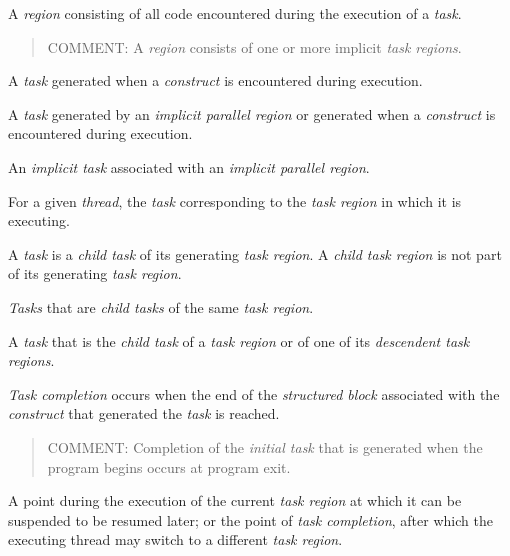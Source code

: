 \glossarydefstart
A \emph{region} consisting of all code encountered during the execution of a \emph{task}. 

\begin{quote}
COMMENT: A  \emph{region} consists of one or more implicit \emph{task regions}. 
\end{quote}
\glossarydefend

\glossarydefstart
A \emph{task} generated when a  \emph{construct} is encountered during execution.
\glossarydefend

\glossarydefstart
A \emph{task} generated by an \emph{implicit parallel region} or generated when a 
\emph{construct} is encountered during execution.
\glossarydefend

\glossarydefstart
An \emph{implicit task} associated with an \emph{implicit parallel region}.
\glossarydefend

\glossarydefstart
For a given \emph{thread}, the \emph{task} corresponding to the \emph{task region} in which it is 
executing.
\glossarydefend

\glossarydefstart
A \emph{task} is a \emph{child task} of its generating \emph{task region}. 
A \emph{child task region} is not part of its generating \emph{task region}.
\glossarydefend

\glossarydefstart
\emph{Tasks} that are \emph{child tasks} of the same \emph{task region}.
\glossarydefend

\glossarydefstart
A \emph{task} that is the \emph{child task} of a \emph{task region} or of one of its 
\emph{descendent task regions}.
\glossarydefend

\glossarydefstart
\emph{Task completion} occurs when the end of the \emph{structured block} associated with the 
\emph{construct} that generated the \emph{task} is reached.

\begin{quote}
COMMENT: Completion of the \emph{initial task} that is generated when the program begins occurs at program exit.
\end{quote}
\glossarydefend

\glossarydefstart
A point during the execution of the current \emph{task region} at which it can be 
suspended to be resumed later; or the point of \emph{task completion}, after which the 
executing thread may switch to a different \emph{task region}. 

